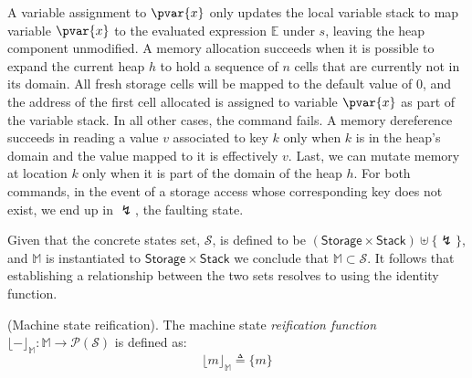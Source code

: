 A variable assignment to $\pvar{x}$ only updates the local variable stack to map variable $\pvar{x}$ to the evaluated expression $\mathds{E}$ under $s$, leaving the heap component unmodified. A memory allocation succeeds when it is possible to expand the current heap $h$ to hold a sequence of $n$ cells that are currently not in its domain. All fresh storage cells will be mapped to the default value of $0$, and the address of the first cell allocated is assigned to variable $\pvar{x}$ as part of the variable stack. In all other cases, the command fails. A memory dereference succeeds in reading a value $v$ associated to key $k$ only when $k$ is in the heap's domain and the value mapped to it is effectively $v$. Last, we can mutate memory at location $k$ only when it is part of the domain of the heap $h$. For both commands, in the event of a storage access whose corresponding key does not exist, we end up in $\lightning$, the faulting state.

Given that the concrete states set, $\mathcal{S}$, is defined to be $(\mathsf{Storage} \times \mathsf{Stack}) \uplus \{\lightning\}$, and $\mathbb{M}$ is instantiated to $\mathsf{Storage} \times \mathsf{Stack}$ we conclude that $\mathbb{M} \subset \mathcal{S}$. It follows that establishing a relationship between the two sets resolves to using the identity function.
\begin{defn}
	(Machine state reification).
	The machine state \emph{reification function} $\lfloor - \rfloor_\mathbb{M} : \mathbb{M} \rightarrow \mathcal{P}(\mathcal{S})$ is defined as:
	\[
		\lfloor m \rfloor_\mathbb{M} \triangleq \{ m \}
	\]
\end{defn}